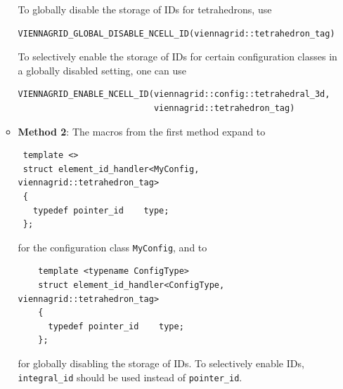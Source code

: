 \begin{itemize}
\begin{itemize}
 To globally disable the storage of IDs for tetrahedrons, use
 \begin{lstlisting}
VIENNAGRID_GLOBAL_DISABLE_NCELL_ID(viennagrid::tetrahedron_tag)
 \end{lstlisting}
 To selectively enable the storage of IDs for certain configuration classes in a globally disabled setting, one can use
 \begin{lstlisting}
VIENNAGRID_ENABLE_NCELL_ID(viennagrid::config::tetrahedral_3d,
                           viennagrid::tetrahedron_tag)
 \end{lstlisting}

 \item \textbf{Method 2}:
The macros from the first method expand to
\begin{lstlisting}
 template <>
 struct element_id_handler<MyConfig, viennagrid::tetrahedron_tag>
 {
   typedef pointer_id    type;
 };
\end{lstlisting}
for the configuration class \lstinline|MyConfig|, and to
\begin{lstlisting}
    template <typename ConfigType>
    struct element_id_handler<ConfigType, viennagrid::tetrahedron_tag>
    {
      typedef pointer_id    type;
    };
\end{lstlisting}
for globally disabling the storage of IDs. To selectively enable IDs, \lstinline|integral_id| should be used instead of \lstinline|pointer_id|.


\end{itemize}





\end{itemize}

